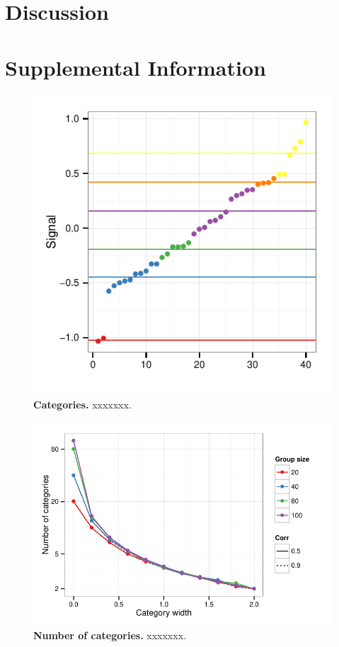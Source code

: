 \section*{Discussion}




\newpage



\section{Supplemental Information } 
\begin{figure}[h]
\caption{\sffamily\small\textbf{Categories.}
     xxxxxxx.}
\label{cats_ex}
\includegraphics[width=.8\textwidth]{figures/categories.pdf}
\end{figure}

\begin{figure}[h]
\caption{\sffamily\small\textbf{Number of categories.}
     xxxxxxx.}
\label{cats_ex}
\includegraphics[width=.8\textwidth]{figures/number_of_categories.pdf}
\end{figure}

